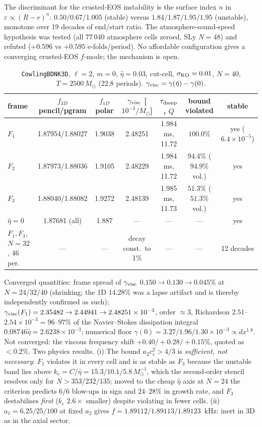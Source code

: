 \documentclass[aps,prd,preprint,amsmath,amssymb,nofootinbib,longbibliography]{revtex4-2}
\newcommand{\Msun}{M_\odot}
\newcommand{\cs}{c_s}
\begin{document}
The discriminant for the crusted-EOS instability is the surface index $n$ in
$\varepsilon\propto(R-r)^n$: $0.50/0.67/1.005$ (stable) versus $1.84/1.87/1.95/1.95$ (unstable),
monotone over 19 decades of end/start ratio. The atmosphere-sound-speed hypothesis was tested
(all $77\,040$ atmosphere cells zeroed, SLy $N=48$) and refuted ($+0.596$ vs $+0.595$
e-folds/period). No affordable configuration gives a converging crusted-EOS $f$-mode; the
mechanism is open.

\begin{table}[htbp]
\caption{\texttt{CowlingBDNK3D}, $\ell=2$, $m=0$, $\hat\eta=0.03$, cut-cell, $\sigma_{\rm KO}=0.01$,
$N=40$, $T=2500\,\Msun$ (22.8 periods). $\gamma_{\rm visc} = \gamma(\hat\eta)-\gamma(0)$.}
\label{tab:bdnk3d}
\scriptsize
\begin{ruledtabular}
\begin{tabular}{lcccccc}
frame & $f_{3D}$ pencil/pgram & $f_{1D}$ polar & $\gamma_{\rm visc}$ [$10^{-3}/\Msun$] & $\tau_{\rm damp}$, $Q$ & bound violated & stable\\
\hline
$F_1$ & 1.87954/1.88027 & 1.9038 & 2.48251 & 1.984 ms, 11.72 & $100.0\%$ & yes ($6.4\times10^{-5}$)\\
$F_2$ & 1.87973/1.88036 & 1.9105 & 2.48229 & 1.984 ms, 11.72 & $94.4\%$ ($94.9\%$ vol.) & yes\\
$F_3$ & 1.88040/1.88082 & 1.9272 & 2.48139 & 1.985 ms, 11.73 & $51.3\%$ ($51.3\%$ vol.) & yes\\
$\hat\eta=0$ & 1.87681 (all) & 1.887 & --- & --- & --- & yes\\
$F_1,F_3$, $N{=}32$, 46 per. & --- & --- & decay const.\ to 1\% & --- & --- & 12 decades\\
\end{tabular}
\end{ruledtabular}
\end{table}

Converged quantities: frame spread of $\gamma_{\rm visc}$ $0.150\to0.130\to0.045\%$ at
$N=24/32/40$ (shrinking; the 1D $14.28\%$ was a lapse artifact and is thereby independently
confirmed as such); $\gamma_{\rm visc}(F_1) = 2.35482\to2.44941\to2.48251\times10^{-3}$, order
$\approx3$, Richardson $2.51$--$2.54\times10^{-3} = 96$--$97\%$ of the Navier--Stokes dissipation
integral $0.08746\hat\eta = 2.6238\times10^{-3}$; numerical floor $\gamma(0) = 3.27/1.96/1.30
\times10^{-3}\propto dx^{1.8}$. Not converged: the viscous frequency shift
$+0.40/+0.28/+0.15\%$, quoted as $<0.2\%$. Two physics results. (i) The bound
$a_2\cs^2>4/3$ is \emph{sufficient, not necessary}: $F_1$ violates it in every cell and is as
stable as $F_3$ because the unstable band lies above $k_c = C/\hat\eta = 15.3/10.1/5.8\,\Msun^{-1}$,
which the second-order stencil resolves only for $N>353/232/135$; moved to the cheap $\hat\eta$
axis at $N=24$ the criterion predicts $6/6$ blow-ups in sign and $24$--$28\%$ in growth rate, and
$F_3$ destabilises \emph{first} ($k_c$ $2.6\times$ smaller) despite violating in fewer cells.
(ii) $a_1 = 6.25/25/100$ at fixed $a_2$ gives $f = 1.89112/1.89113/1.89123$~kHz: inert in 3D
as in the axial sector.
\end{document}
